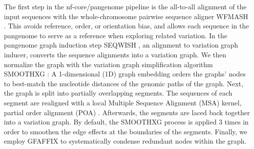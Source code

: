\documentclass{bioinfo}
\theoremstyle{definition}
\begin{document}
	The first step in the nf-core/pangenome pipeline is the all-to-all alignment of the input sequences with the whole-chromosome pairwise sequence aligner WFMASH \citep{wfmash}. 
	This avoids reference, order, or orientation bias, and allows each sequence in the pangenome to serve as a reference when exploring related variation. 
	In the pangenome graph induction step SEQWISH \citep{Garrison2022}, an alignment to variation graph inducer, converts the sequence alignments into a variation graph. 
	We then normalize the graph with the variation graph simplification algorithm SMOOTHXG \citep{Garrison2023}:
	A 1-dimensional (1D) graph embedding \citep{Heumos2023} orders the graphs’ nodes to best-match the nucleotide distances of the genomic paths of the graph.
	Next, the graph is split into partially overlapping segments. 
	The sequences of each segment are realigned with a local Multiple Sequence Alignment (MSA) kernel, partial order alignment (POA) \citep{Lee2002}.
	Afterwards, the segments are laced back together into a variation graph. 
	By default, the SMOOTHXG process is applied 3 times in order to smoothen the edge effects at the boundaries of the segments.
	Finally, we employ GFAFFIX \citep{Liao2023} to systematically condense redundant nodes within the graph.
	
\end{document}

